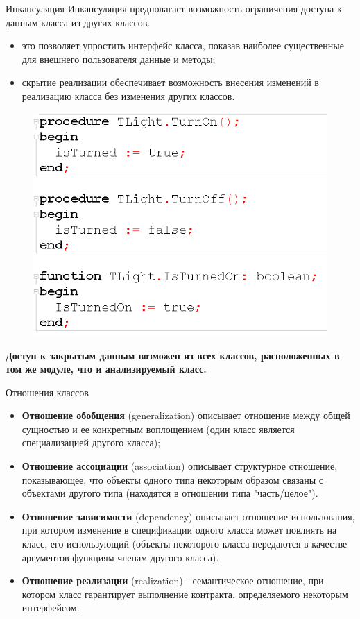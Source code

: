 \documentclass{beamer}
\begin{document}
\begin{frame}{Инкапсуляция}
Инкапсуляция предполагает возможность ограничения доступа к данным класса из 
других классов. 
\begin{itemize}
\item это позволяет упростить интерфейс класса, показав наиболее существенные для внешнего пользователя данные и методы;
\item скрытие реализации обеспечивает возможность внесения изменений в реализацию класса без изменения других классов.
\end{itemize}
\begin{figure}[h]
\centering
\includegraphics[scale=0.3]{images/lec04-pic09.png}
\end{figure}
\textbf{Доступ к закрытым данным возможен из всех классов, расположенных в том же модуле, что и анализируемый класс.}
\end{frame}

\begin{frame}{Отношения классов}
\begin{itemize}
\item \textbf{Отношение обобщения} (generalization) описывает отношение между общей
сущностью и ее конкретным воплощением (один класс является специализацией другого класса);
\item \textbf{Отношение ассоциации} (association) описывает структурное отношение,
показывающее, что объекты одного типа некоторым образом связаны
с объектами другого типа (находятся в отношении типа "часть/целое").
\item \textbf{Отношение зависимости} (dependency) описывает отношение использования, при котором изменение в спецификации одного класса может повлиять на класс, его использующий (объекты некоторого класса передаются в качестве аргументов функциям-членам другого класса).
\item \textbf{Отношение реализации} (realization) - семантическое отношение, при котором класс гарантирует выполнение контракта, определяемого некоторым интерфейсом.
\end{itemize}
\end{frame}
\end{document}
